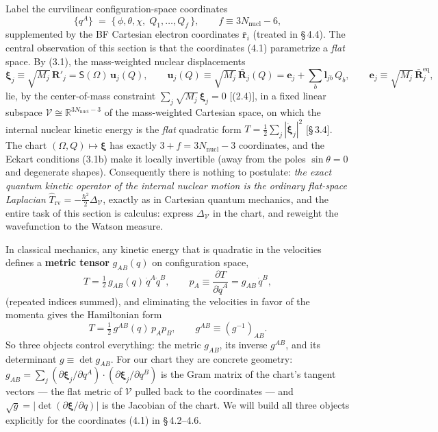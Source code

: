Label the curvilinear configuration-space coordinates
\begin{equation}
\{q^{A}\}\;=\;\bigl\{\,\phi,\theta,\chi,\;Q_1,\dots,Q_f\,\bigr\},\qquad f\equiv 3N_{\mathrm{nucl}}-6, \tag{4.1}
\end{equation}
supplemented by the BF Cartesian electron coordinates $\bar{\mathbf{r}}_i$ (treated in \S\,4.4). The central observation of this section is that the coordinates (4.1) parametrize a \emph{flat} space. By (3.1), the mass-weighted nuclear displacements
\begin{equation*}
\boldsymbol\xi_j\equiv\sqrt{M_j}\,\mathbf R'_j=\mathsf S(\Omega)\,\mathbf u_j(Q),
\qquad
\mathbf u_j(Q)\equiv\sqrt{M_j}\,\bar{\mathbf R}_j(Q)=\mathbf e_j+\sum_b\mathbf l_{jb}\,Q_b,
\qquad
\mathbf e_j\equiv\sqrt{M_j}\,\bar{\mathbf R}^{\mathrm{eq}}_j,
\end{equation*}
lie, by the center-of-mass constraint $\sum_j\sqrt{M_j}\,\boldsymbol\xi_j=0$ [(2.4)], in a fixed linear subspace $\mathcal V\cong\mathbb R^{3N_{\mathrm{nucl}}-3}$ of the mass-weighted Cartesian space, on which the internal nuclear kinetic energy is the \emph{flat} quadratic form $T=\tfrac12\sum_j|\dot{\boldsymbol\xi}_j|^{2}$ [\S\,3.4]. The chart $(\Omega,Q)\mapsto\boldsymbol\xi$ has exactly $3+f=3N_{\mathrm{nucl}}-3$ coordinates, and the Eckart conditions (3.1b) make it locally invertible (away from the poles $\sin\theta=0$ and degenerate shapes). Consequently there is nothing to postulate: \emph{the exact quantum kinetic operator of the internal nuclear motion is the ordinary flat-space Laplacian} $\hat T_{\mathrm{rv}}=-\tfrac{\hbar^{2}}{2}\Delta_{\mathcal V}$, exactly as in Cartesian quantum mechanics, and the entire task of this section is calculus: express $\Delta_{\mathcal V}$ in the chart, and reweight the wavefunction to the Watson measure.

In classical mechanics, any kinetic energy that is quadratic in the velocities defines a \textbf{metric tensor} $g_{AB}(q)$ on configuration space,
\begin{equation}
T=\tfrac12\,g_{AB}(q)\,\dot q^{A}\dot q^{B},\qquad
p_A\equiv\frac{\partial T}{\partial\dot q^{A}}=g_{AB}\,\dot q^{B}, \tag{4.2}
\end{equation}
(repeated indices summed), and eliminating the velocities in favor of the momenta gives the Hamiltonian form
\begin{equation}
T=\tfrac12\,g^{AB}(q)\,p_A p_B ,\qquad g^{AB}\equiv (g^{-1})_{AB}. \tag{4.3}
\end{equation}
So three objects control everything: the metric $g_{AB}$, its inverse $g^{AB}$, and its determinant $g\equiv\det g_{AB}$. For our chart they are concrete geometry: $g_{AB}=\sum_j(\partial\boldsymbol\xi_j/\partial q^A)\!\cdot\!(\partial\boldsymbol\xi_j/\partial q^B)$ is the Gram matrix of the chart's tangent vectors --- the flat metric of $\mathcal V$ pulled back to the coordinates --- and $\sqrt g=|\det(\partial\boldsymbol\xi/\partial q)|$ is the Jacobian of the chart. We will build all three objects explicitly for the coordinates (4.1) in \S\,4.2--4.6.

